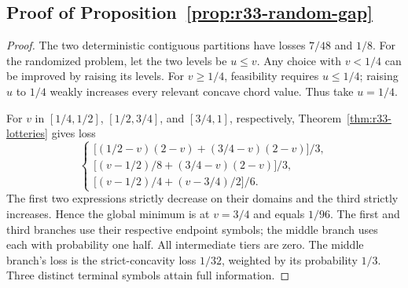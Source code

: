 \subsection{Proof of Proposition~\ref{prop:r33-random-gap}}\label{ec-proof-prop-r33-random-gap}
\begin{proof}
The two deterministic contiguous partitions have losses $7/48$ and $1/8$. For the randomized problem, let the two levels be $u\leq v$. Any choice with $v<1/4$ can be improved by raising its levels. For $v\geq1/4$, feasibility requires $u\leq1/4$; raising $u$ to $1/4$ weakly increases every relevant concave chord value. Thus take $u=1/4$.

For $v$ in $[1/4,1/2]$, $[1/2,3/4]$, and $[3/4,1]$, respectively, Theorem~\ref{thm:r33-lotteries} gives loss
\[
 \begin{cases}
 \bigl[(1/2-v)(2-v)+(3/4-v)(2-v)\bigr]/3,\\[2pt]
 \bigl[(v-1/2)/8+(3/4-v)(2-v)\bigr]/3,\\[2pt]
 \bigl[(v-1/2)/4+(v-3/4)/2\bigr]/6.
 \end{cases}
\]
The first two expressions strictly decrease on their domains and the third strictly increases. Hence the global minimum is at $v=3/4$ and equals $1/96$. The first and third branches use their respective endpoint symbols; the middle branch uses each with probability one half. All intermediate tiers are zero. The middle branch's loss is the strict-concavity loss $1/32$, weighted by its probability $1/3$. Three distinct terminal symbols attain full information.
\end{proof}
